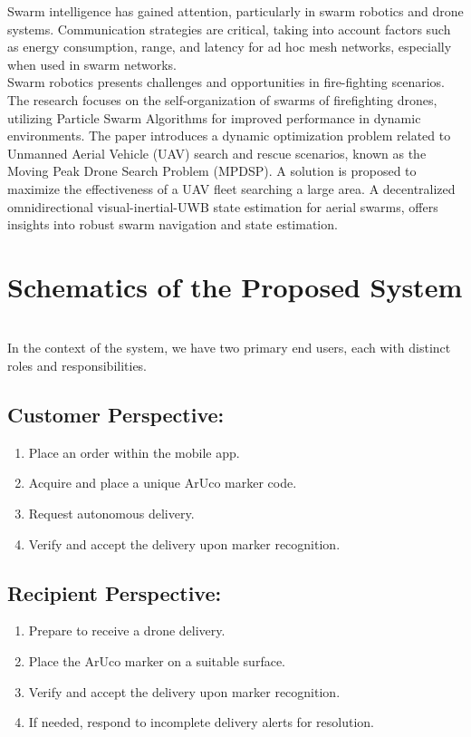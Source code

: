 \documentclass[preprint,12pt]{elsarticle}
\begin{document}
Swarm intelligence has gained attention, particularly in swarm robotics and drone systems. Communication strategies are critical, taking into account factors such as energy consumption, range, and latency for ad hoc mesh networks, especially when used in swarm networks\cite{cui2017brief}.\\ Swarm robotics presents challenges and opportunities in fire-fighting scenarios. The research focuses on the self-organization of swarms of firefighting drones, utilizing Particle Swarm Algorithms for improved performance in dynamic environments\cite{innocente2019self}. The paper introduces a dynamic optimization problem related to Unmanned Aerial Vehicle (UAV) search and rescue scenarios, known as the Moving Peak Drone Search Problem (MPDSP). A solution is proposed to maximize the effectiveness of a UAV fleet searching a large area\cite{kyriakakis2021moving}. A decentralized omnidirectional visual-inertial-UWB state estimation for aerial swarms, offers insights into robust swarm navigation and state estimation\cite{xu2022omni}.\\

\section{Schematics of the Proposed System}\\

In the context of the system, we have two primary end users, each with distinct roles and responsibilities. 

\subsection{Customer Perspective:}
\begin{enumerate}
\item Place an order within the mobile app.
\item Acquire and place a unique ArUco marker code.
\item Request autonomous delivery.
\item Verify and accept the delivery upon marker recognition.
\end{enumerate}

\subsection{Recipient Perspective:}
\begin{enumerate}
\item Prepare to receive a drone delivery.
\item Place the ArUco marker on a suitable surface.
\item Verify and accept the delivery upon marker recognition.
\item If needed, respond to incomplete delivery alerts for resolution.
\end{enumerate}
\end{document}
